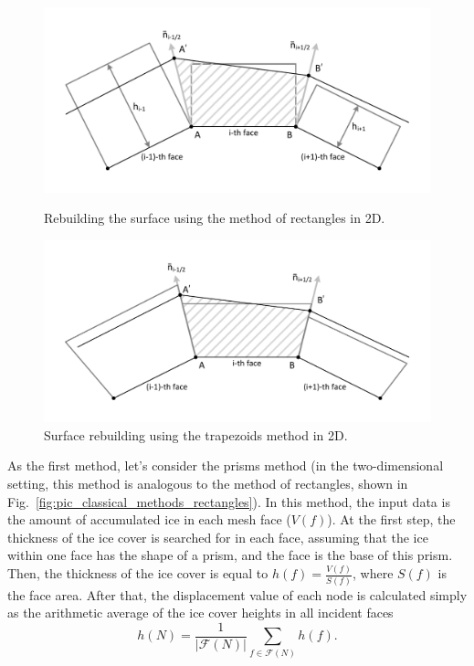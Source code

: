 \documentclass[
11pt,
tightenlines,
twoside,
onecolumn,
nofloats,
nobibnotes,
nofootinbib,
superscriptaddress,
noshowpacs,
centertags]
{revtex4-2}
\begin{document}
\begin{figure}[h]
  \centering
  \begin{minipage}[h]{0.6\textwidth}
    \includegraphics[width=\textwidth]{pics/pic_classical_methods_rectangles_size.pdf}
    \caption{Rebuilding the surface using the method of rectangles in 2D.}\label{fig:pic_classical_methods_rectangles}
  \end{minipage}
  \hfill
  \begin{minipage}[h]{0.6\textwidth}
    \includegraphics[width=\textwidth]{pics/pic_classical_methods_trapezoids_size.pdf}
    \caption{Surface rebuilding using the trapezoids method in 2D.}\label{fig:pic_classical_methods_trapezoids}
  \end{minipage}
\end{figure}

As the first method, let's consider the prisms method (in the two-dimensional setting, this method is analogous to the method of rectangles, shown in Fig.~\ref{fig:pic_classical_methods_rectangles}).
In this method, the input data is the amount of accumulated ice in each mesh face ($V(f)$).
At the first step, the thickness of the ice cover is searched for in each face, assuming that the ice within one face has the shape of a prism, and the face is the base of this prism.
Then, the thickness of the ice cover is equal to $h(f) =
\frac{V(f)}{S(f)}$, where $S(f)$ is the face area.
After that, the displacement value of each node is calculated simply
as the arithmetic average of the ice cover heights in all incident
faces
\begin{equation}
h(N) = \frac{1}{|\mathscr{F}(N)|} \sum_{f \in \mathscr{F}(N)}{h(f)}.
\end{equation}
\end{document}
